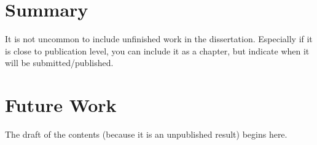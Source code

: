 \section{Summary}
It is not uncommon to include unfinished work in the dissertation. Especially if it is close to publication level, you can include it as a chapter, but indicate when it will be submitted/published.


\section{Future Work}
The draft of the contents (because it is an unpublished result) begins here.